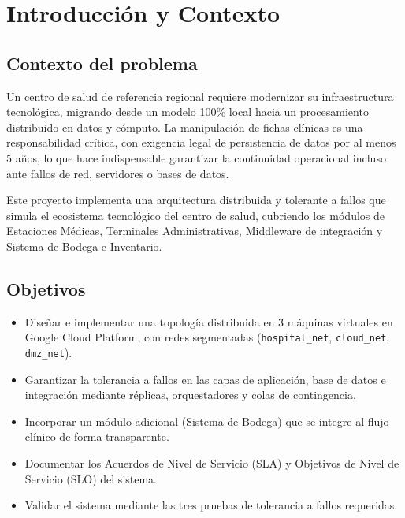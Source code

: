 \documentclass[11pt,a4paper]{article}
\begin{document}
\section{Introducción y Contexto}

\subsection{Contexto del problema}

Un centro de salud de referencia regional requiere modernizar su infraestructura tecnológica,
migrando desde un modelo 100\% local hacia un procesamiento distribuido en datos y cómputo.
La manipulación de fichas clínicas es una responsabilidad crítica, con exigencia legal de
persistencia de datos por al menos 5 años, lo que hace indispensable garantizar la continuidad
operacional incluso ante fallos de red, servidores o bases de datos.

Este proyecto implementa una arquitectura distribuida y tolerante a fallos que simula el
ecosistema tecnológico del centro de salud, cubriendo los módulos de Estaciones Médicas,
Terminales Administrativas, Middleware de integración y Sistema de Bodega e Inventario.

\subsection{Objetivos}

\begin{itemize}[leftmargin=1.5em]
    \item Diseñar e implementar una topología distribuida en 3 máquinas virtuales en Google
          Cloud Platform, con redes segmentadas (\texttt{hospital\_net}, \texttt{cloud\_net},
          \texttt{dmz\_net}).
    \item Garantizar la tolerancia a fallos en las capas de aplicación, base de datos e
          integración mediante réplicas, orquestadores y colas de contingencia.
    \item Incorporar un módulo adicional (Sistema de Bodega) que se integre al flujo clínico
          de forma transparente.
    \item Documentar los Acuerdos de Nivel de Servicio (SLA) y Objetivos de Nivel de Servicio
          (SLO) del sistema.
    \item Validar el sistema mediante las tres pruebas de tolerancia a fallos requeridas.
\end{itemize}
\end{document}
